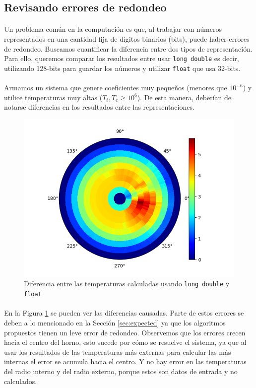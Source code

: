 \documentclass[12pt]{article}
\begin{document}
\subsection{Revisando errores de redondeo}
\label{sec:rounding}

\paragraph{} Un problema común en la computación es que, al trabajar con números representados en una cantidad fija de dígitos binarios (bits), puede haber errores de redondeo. Buscamos cuantificar la diferencia entre dos tipos de representación. Para ello, queremos comparar los resultados entre usar \texttt{long double} es decir, utilizando 128-bits para guardar los números y utilizar \texttt{float} que usa 32-bits. 
\paragraph{} Armamos un sistema que genere coeficientes muy pequeños (menores que \(10^{-6}\)) y utilice temperaturas muy altas (\(T_i, T_e \geq 10^6\)). De esta manera, deberían de notarse diferencias en los resultados entre las representaciones.

\begin{figure}[H]
\centering
\includegraphics[scale=0.5]{rounding.temperature}
\caption{Diferencia entre las temperaturas calculadas usando \texttt{long double} y \texttt{float}}
\label{fig:rounding.diffs}
\end{figure}

\paragraph{} En la Figura \ref{fig:rounding.diffs} se pueden ver las diferencias causadas. Parte de estos errores se deben a lo mencionado en la Sección \ref{sec:expected} ya que los algoritmos propuestos tienen un leve error de redondeo. Observemos que los errores crecen hacia el centro del horno, esto sucede por cómo se resuelve el sistema, ya que al usar los resultados de las temperaturas más externas para calcular las más internas el error se acumula hacia el centro. Y no hay error en las temperaturas del radio interno y del radio externo, porque estos son datos de entrada y no calculados.
\end{document}
